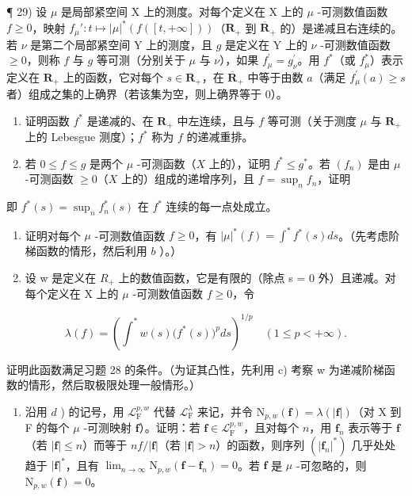 ¶ 29) 设 \(\mu\) 是局部紧空间 X 上的测度。对每个定义在 X 上的 \(\mu\) -可测数值函数 \(f \geqslant 0\)，映射 \(f_{\mu}' : t \mapsto |\mu|^*(f([t, +\infty]))\)（\(\mathbf{R}_+\) 到 \(\overline{\mathbf{R}}_{+}\) 的）是递减且右连续的。若 \(\nu\) 是第二个局部紧空间 Y 上的测度，且 \(g\) 是定义在 Y 上的 \(\nu\) -可测数值函数 \(\geqslant 0\)，则称 \(f\) 与 \(g\) 等可测（分别关于 \(\mu\) 与 \(\nu\)），如果 \(f_{\mu}^{\prime} = g_{\nu}^{\prime}\)。用 \(f^{*}\)（或 \(f_{\mu}^{*}\)）表示定义在 \(\mathbf{R}_{+}\) 上的函数，它对每个 \(s \in \mathbf{R}_{+}\)，在 \(\overline{\mathbf{R}}_{+}\) 中等于由数 \(a\)（满足 \(f_{\mu}^{\prime}(a) \geqslant s\) 者）组成之集的上确界（若该集为空，则上确界等于 0）。

\begin{enumerate}
\def\labelenumi{\alph{enumi})}
\item
  证明函数 \(f^{*}\) 是递减的、在 \(\mathbf{R}_{+}\) 中左连续，且与 \(f\) 等可测（关于测度 \(\mu\) 与 \(\mathbf{R}_{+}\) 上的 Lebesgue 测度）；\(f^{*}\) 称为 \(f\) 的递减重排。
\item
  若 \(0 \leqslant f \leqslant g\) 是两个 \(\mu\) -可测函数（\(X\) 上的），证明 \(f^* \leqslant g^*\)。若 \((f_n)\) 是由 \(\mu\) -可测函数 \(\geqslant 0\)（\(X\) 上的）组成的递增序列，且 \(f = \sup_{n} f_n\)，证明
\end{enumerate}

即 \(f^{*}(s) = \sup_{n}f_{n}^{*}(s)\) 在 \(f^{*}\) 连续的每一点处成立。

\begin{enumerate}
\def\labelenumi{\alph{enumi})}
\setcounter{enumi}{2}
\item
  证明对每个 \(\mu\) -可测数值函数 \(f \geqslant 0\)，有 \(|\mu|^{*}(f) = \int^{*} f^{*}(s) ds\)。（先考虑阶梯函数的情形，然后利用 \(b\) ）。）
\item
  设 w 是定义在 \(R_{+}\) 上的数值函数，它是有限的（除点 s = 0 外）且递减。对每个定义在 X 上的 \(\mu\) -可测数值函数 \(f \geqslant 0\)，令
\end{enumerate}

\[
\lambda (f) = \left(\int^ {*} w (s) \bigl (f ^ {*} (s) \bigr) ^ {p} d s\right) ^ {1 / p} \quad (1 \leqslant p <   + \infty).
\]

证明此函数满足习题 28 的条件。（为证其凸性，先利用 c) 考察 w 为递减阶梯函数的情形，然后取极限处理一般情形。）

\begin{enumerate}
\def\labelenumi{\alph{enumi})}
\setcounter{enumi}{4}
\tightlist
\item
  沿用 \(d\) ) 的记号，用 \(\mathcal{L}_{\mathrm{F}}^{p,w}\) 代替 \(\mathcal{L}_{\mathrm{F}}^{\lambda}\) 来记，并令 \(\mathrm{N}_{p,w}(\mathbf{f}) = \lambda (|\mathbf{f}|)\)（对 X 到 F 的每个 \(\mu\) -可测映射 \(\mathbf{f}\)）。证明：若 \(\mathbf{f} \in \mathcal{L}_{\mathrm{F}}^{p,w}\)，且对每个 \(n\)，用 \(\mathbf{f}_n\) 表示等于 \(\mathbf{f}\)（若 \(|\mathbf{f}| \leqslant n\)）而等于 \(nf / |\mathbf{f}|\)（若 \(|\mathbf{f}| > n\)）的函数，则序列 \((|\mathbf{f}_n|^*)\) 几乎处处趋于 \(|\mathbf{f}|^*\)，且有 \(\lim_{n \to \infty} \mathrm{N}_{p,w}(\mathbf{f} - \mathbf{f}_n) = 0\)。若 \(\mathbf{f}\) 是 \(\mu\) -可忽略的，则 \(\mathrm{N}_{p,w}(\mathbf{f}) = 0\)。
\end{enumerate}

